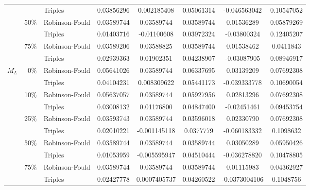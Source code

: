 \begin{tabular}{rrlccccc}
              &              & Triples        & 0.03856296 & 0.002185408  & 0.05061314 & -0.046563042  & 0.10547052 \\
              & 50\%         & Robinson-Fould & 0.03589744 & 0.03589744  & 0.03589744 & 0.01536289  & 0.05879269 \\
              &              & Triples        & 0.01403716 & -0.01100608  & 0.03972324 & -0.03800324  & 0.12405207 \\
              & 75\%         & Robinson-Fould & 0.03589206 & 0.03588825  & 0.03589744 & 0.01538462  & 0.0411843 \\
              &              & Triples        & 0.02939363 & 0.01902351  & 0.04238907 & -0.03087905  & 0.08946917 \\   
    $M_L$     & 0\%          & Robinson-Fould & 0.05641026 & 0.03589744  & 0.06337695 & 0.03139209  & 0.07692308 \\
              &              & Triples        & 0.04104231 & 0.008309622  & 0.05441173 & -0.039333778  & 0.10690054 \\
              & 10\%         & Robinson-Fould & 0.05637057 & 0.03589744  & 0.05927956 & 0.02813296  & 0.07692308 \\
              &              & Triples        & 0.03008132 & 0.01176800  & 0.04847400 & -0.02451461  & 0.09453754 \\
              & 25\%         & Robinson-Fould & 0.03593743 & 0.03589744  & 0.03596018 & 0.02330790  & 0.07692308 \\
              &              & Triples        & 0.02010221 & -0.001145118  & 0.0377779 & -0.060183332  & 0.1098632 \\
              & 50\%         & Robinson-Fould & 0.03589744 & 0.03589744  & 0.03589744 & 0.03050289  & 0.05950426 \\
              &              & Triples        & 0.01053959 & -0.005595947  & 0.04510444 & -0.036278820  & 0.10478805 \\
              & 75\%         & Robinson-Fould & 0.03589744 & 0.03589744  & 0.03589744 & 0.01115983  & 0.04362927 \\
              &              & Triples        & 0.02427778 & 0.0007405737  & 0.04260522 & -0.0373004106  & 0.1048756 \\
\end{tabular}